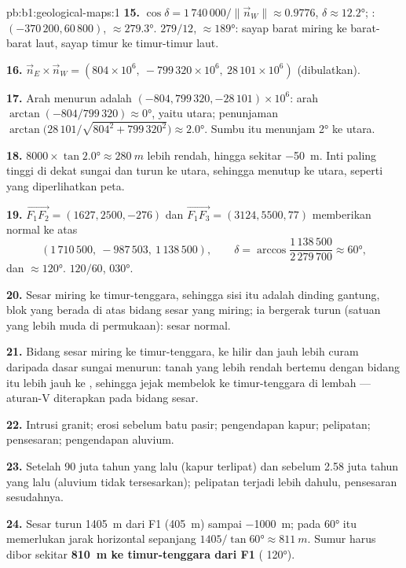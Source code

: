 \begin{solution}{pb:b1:geological-maps:1}
\textbf{15.} $\cos\delta = 1\,740\,000/\|\vec n_W\| \approx 0.9776$, $\delta
\approx \ang{12.2}$; :  $(-370\,200, 60\,800)$,
$\approx \ang{279.3}$.  $279/12$,  $\approx \ang{189}$: sayap barat
miring ke barat-barat laut, sayap timur ke timur-timur laut.

\textbf{16.} $\vec n_E \times \vec n_W = (804 \times 10^6,\ -799\,320 \times
10^6,\ 28\,101 \times 10^6)$ (dibulatkan).

\textbf{17.} Arah menurun adalah $(-804, 799\,320, -28\,101) \times
10^6$: arah $\arctan(-804/799\,320) \approx \ang{0}$, yaitu utara; penunjaman
$\arctan\bigl(28\,101/\sqrt{804^2 + 799\,320^2}\bigr) \approx \ang{2.0}$. Sumbu itu menunjam \ang{2} ke utara.

\textbf{18.} $8000 \times \tan\ang{2.0} \approx \qty{280}{m}$ lebih rendah, hingga sekitar
\qty{-50}{m}. Inti  paling tinggi di dekat sungai dan turun ke utara, sehingga  menutup ke utara, seperti yang diperlihatkan peta.

\textbf{19.} $\overrightarrow{F_1F_2} = (1627, 2500, -276)$ dan
$\overrightarrow{F_1F_3} = (3124, 5500, 77)$ memberikan normal ke atas
\[
  (1\,710\,500,\ -987\,503,\ 1\,138\,500), \qquad
  \delta = \arccos\frac{1\,138\,500}{2\,279\,700} \approx \ang{60},
\]
dan  $\approx \ang{120}$.  $120/60$, 
\ang{030}.

\textbf{20.} Sesar miring ke timur-tenggara, sehingga sisi itu adalah dinding gantung, blok yang berada di atas bidang sesar yang miring; ia bergerak turun (satuan yang lebih muda di permukaan): sesar normal.

\textbf{21.} Bidang sesar miring ke timur-tenggara, ke hilir dan jauh lebih curam daripada dasar sungai menurun: tanah yang lebih rendah bertemu dengan bidang itu lebih jauh ke , sehingga jejak membelok ke timur-tenggara di lembah --- aturan-V diterapkan pada bidang sesar.

\textbf{22.} Intrusi granit; erosi sebelum batu pasir; pengendapan kapur; pelipatan; pensesaran; pengendapan aluvium.

\textbf{23.} Setelah 90 juta tahun yang lalu (kapur terlipat) dan sebelum 2.58 juta tahun yang lalu (aluvium tidak tersesarkan); pelipatan terjadi lebih dahulu, pensesaran sesudahnya.

\textbf{24.} Sesar turun \qty{1405}{m} dari F1 (\qty{405}{m}) sampai \qty{-1000}{m}; pada  \ang{60} itu memerlukan jarak horizontal sepanjang  $1405/\tan\ang{60} \approx \qty{811}{m}$. Sumur harus dibor sekitar \textbf{\qty[text-series-to-math=true]{810}{m} ke timur-tenggara dari F1} ( \ang{120}).
\end{solution}
